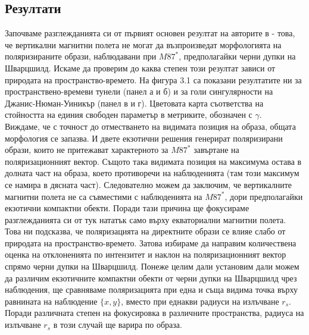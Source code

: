\documentclass[12pt]{article}
\numberwithin{equation}{section}
\numberwithin{figure}{section}
\begin{document}
	\subsection{Резултати}
	
	Започваме разглежданията си от първият основен резултат на авторите в \cite{Narayan2021} - това, че вертикални магнитни полета не могат да възпроизведат морфологията на поляризираните образи, наблюдавани при $M87^*$, предполагайки черни дупки на Шварцшилд. Искаме да проверим до каква степен този резултат зависи от природата на пространство-времето. На фигура 3.1 са показани резултатите ни за пространствено-времеви тунели (панел а и б) и за голи сингулярности на Джанис-Нюман-Уиникър (панел в и г). Цветовата карта съответства на стойността на единия свободен параметър в метриките, обозначен с $\gamma$. \\
	
	Виждаме, че с точност до отместването на видимата позиция на образа, общата морфология се запазва. И двете екзотични решения генерират поляризирани образи, които не притежават характерното за $M87^*$ завъртане на поляризационният вектор. Същото така видимата позиция на максимума остава в долната част на образа, което противоречи на наблюденията (там този максимум се намира в дясната част). Следователно можем да заключим, че вертикалните магнитни полета не са съвместими с наблюденията на $M87^*$, дори предполагайки екзотични компактни обекти. Поради тази причина ще фокусираме разглежданията си от тук нататък само върху екваториални магнитни полета. \\
	
	Това ни подсказва, че поляризацията на директните образи се влияе слабо от природата на пространство-времето. Затова избираме да направим количествена оценка на отклоненията по интензитет и наклон на поляризационният вектор спрямо черни дупки на Шварцшилд. Понеже целим дали установим дали можем да различим екзотичните компактни обекти от черни дупки на Шварцшилд чрез наблюдения, ще сравняваме поляризацията при една и съща видима точка върху равнината на наблюдение $\{x,y\}$, вместо при еднакви радиуси на излъчване $r_s$. Поради различната степен на фокусировка в различните пространства, радиуса на излъчване $r_s$ в този случай ще варира по образа.\\
\end{document}
